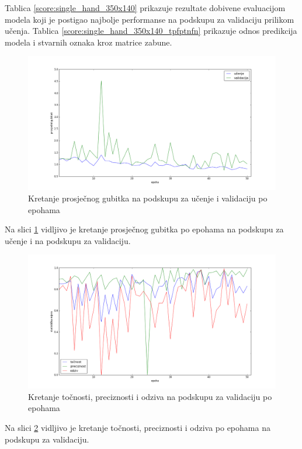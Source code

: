 \documentclass[times, utf8, diplomski, numeric]{fer}
\begin{document}
\noindent Tablica \ref{score:single_hand_350x140} prikazuje rezultate dobivene evaluacijom modela koji je postigao najbolje performanse na podskupu za validaciju prilikom učenja.
Tablica \ref{score:single_hand_350x140_tpfptnfn} prikazuje odnos predikcija modela i stvarnih oznaka kroz matrice zabune.

\begin{figure}[H]
\centering
\includegraphics[scale=0.35]{images/single_hand_scale050_loss.png}
\caption{Kretanje prosječnog gubitka na podskupu za učenje i validaciju po epohama}
\label{img:single_hand_scale050_loss}
\end{figure}
\noindent Na slici \ref{img:single_hand_scale050_loss} vidljivo je kretanje prosječnog gubitka po epohama na podskupu za učenje i na podskupu za validaciju.

\begin{figure}[H]
\centering
\includegraphics[scale=0.35]{images/single_hand_scale050_acc_ap.png}
\caption{Kretanje točnosti, preciznosti i odziva na podskupu za validaciju po epohama}
\label{img:single_hand_scale050_acc_ap}
\end{figure}
\noindent Na slici \ref{img:single_hand_scale050_acc_ap} vidljivo je kretanje točnosti, preciznosti i odziva po epohama na podskupu za validaciju.
\end{document}
